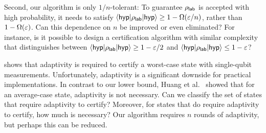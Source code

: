 Second, our algorithm is only $1/n$-tolerant: To guarantee $\rho_{\mathsf{lab}}$ is accepted with high probability, it needs to satisfy $\langle\mathsf{hyp}\rvert\rho_{\mathsf{lab}}\lvert\mathsf{hyp}\rangle \geq 1 - \Omega(\varepsilon/n)$, rather than $1-\Omega(\varepsilon)$. Can this dependence on $n$ be improved or even eliminated? For instance, is it possible to design a certification algorithm with similar complexity that distinguishes between $\langle\mathsf{hyp}\rvert\rho_{\mathsf{lab}}\lvert\mathsf{hyp}\rangle \geq 1 - \varepsilon/2$ and $\langle\mathsf{hyp}\rvert\rho_{\mathsf{lab}}\lvert\mathsf{hyp}\rangle \leq 1 - \varepsilon$?

 shows that adaptivity is required to certify a worst-case state with single-qubit measurements. Unfortunately, adaptivity is a significant downside for practical implementations. In contrast to our lower bound, Huang et al.~\cite{huang2024certifying} showed that for an average-case state, adaptivity is not necessary. Can we classify the set of states that require adaptivity to certify? Moreover, for states that do require adaptivity to certify, how much is necessary? Our algorithm requires $n$ rounds of adaptivity, but perhaps this can be reduced.


%




